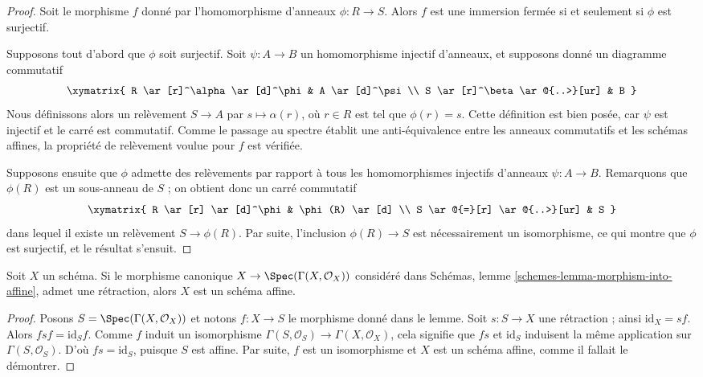 \begin{proof}
Soit le morphisme $f$ donné par l'homomorphisme d'anneaux $\phi : R \to S$.
Alors $f$ est une immersion fermée si et seulement si $\phi$ est surjectif.

\medskip\noindent
Supposons tout d'abord que $\phi$ soit surjectif.
Soit $\psi : A \to B$ un homomorphisme injectif d'anneaux, et supposons donné
un diagramme commutatif
$$
\xymatrix{
R \ar[r]^\alpha \ar[d]^\phi & A \ar[d]^\psi \\
S \ar[r]^\beta \ar@{..>}[ur] & B
}
$$
Nous définissons alors un relèvement $S \to A$ par $s \mapsto \alpha(r)$, où
$r \in R$ est tel que $\phi(r) = s$.
Cette définition est bien posée, car $\psi$ est injectif et le carré est commutatif.
Comme le passage au spectre établit une anti-équivalence entre les anneaux
commutatifs et les schémas affines, la propriété de relèvement voulue pour
$f$ est vérifiée.

\medskip\noindent
Supposons ensuite que $\phi$ admette des relèvements par rapport à tous les
homomorphismes injectifs d'anneaux $\psi: A \to B$.
Remarquons que $\phi(R)$ est un sous-anneau de $S$ ; on obtient donc un carré
commutatif
$$
\xymatrix{
R \ar[r] \ar[d]^\phi  & \phi(R) \ar[d] \\
S \ar@{=}[r] \ar@{..>}[ur] & S
}
$$
dans lequel il existe un relèvement $S \to \phi(R)$.
Par suite, l'inclusion $\phi(R) \to S$ est nécessairement un isomorphisme, ce qui
montre que $\phi$ est surjectif, et le résultat s'ensuit.
\end{proof}

\begin{lemma}
\label{lemma-scheme-affine-if-aff-is-split-mono}
Soit $X$ un schéma.
Si le morphisme canonique $X \to \Spec(\Gamma(X, \mathcal{O}_X))$
considéré dans Schémas, lemme \ref{schemes-lemma-morphism-into-affine},
admet une rétraction, alors $X$ est un schéma affine.
\end{lemma}

\begin{proof}
Posons $S = \Spec(\Gamma(X, \mathcal{O}_X))$ et notons $f : X \to S$ le morphisme
donné dans le lemme. Soit $s : S \to X$ une rétraction ; ainsi $\text{id}_X = sf$.
Alors $f s f = \text{id}_S f$. Comme $f$ induit un isomorphisme
$\Gamma(S, \mathcal{O}_S) \to \Gamma(X, \mathcal{O}_X)$,
cela signifie que $fs$ et $\text{id}_S$ induisent la même application
sur $\Gamma(S, \mathcal{O}_S)$. D'où $f s = \text{id}_S$, puisque $S$
est affine. Par suite, $f$ est un isomorphisme et $X$ est un schéma affine,
comme il fallait le démontrer.
\end{proof}


